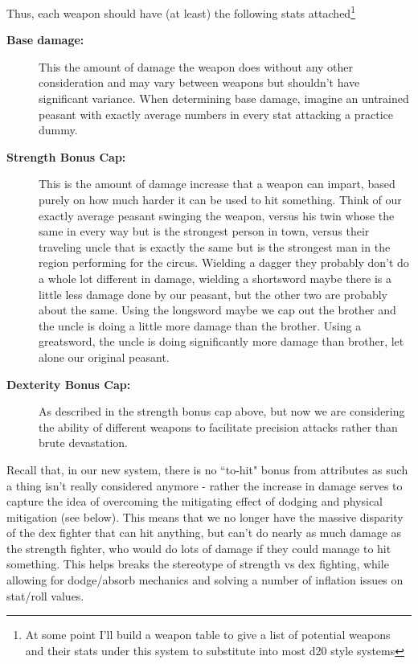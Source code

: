 \documentclass{article}
\begin{document}
            Thus, each weapon should have (at least) the following stats attached\footnote{At some point I'll build a weapon table to give a list of potential weapons and their stats under this system to substitute into most d20 style systems}
            \begin{description}
                \item[\textbf{Base damage:} ] This the amount of damage the weapon does without any other consideration and may vary between weapons but shouldn't have significant variance. When determining base damage, imagine an untrained peasant with exactly average numbers in every stat attacking a practice dummy.
                \item[\textbf{Strength Bonus Cap:} ] This is the amount of damage increase that a weapon can impart, based purely on how much harder it can be used to hit something. Think of our exactly average peasant swinging the weapon, versus his twin whose the same in every way but is the strongest person in town, versus their traveling uncle that is exactly the same but is the strongest man in the region performing for the circus. Wielding a dagger they probably don't do a whole lot different in damage, wielding a shortsword maybe there is a little less damage done by our peasant, but the other two are probably about the same. Using the longsword maybe we cap out the brother and the uncle is doing a little more damage than the brother. Using a greatsword, the uncle is doing significantly more damage than brother, let alone our original peasant.
                \item[\textbf{Dexterity Bonus Cap:} ] As described in the strength bonus cap above, but now we are considering the ability of different weapons to facilitate precision attacks rather than brute devastation.
            \end{description}
            
            Recall that, in our new system, there is no ``to-hit" bonus from attributes as such a thing isn't really considered anymore - rather the increase in damage serves to capture the idea of overcoming the mitigating effect of dodging and physical mitigation (see below). This means that we no longer have the massive disparity of the dex fighter that can hit anything, but can't do nearly as much damage as the strength fighter, who would do lots of damage if they could manage to hit something. This helps breaks the stereotype of strength vs dex fighting, while allowing for dodge/absorb mechanics and solving a number of inflation issues on stat/roll values.
            
\end{document}
